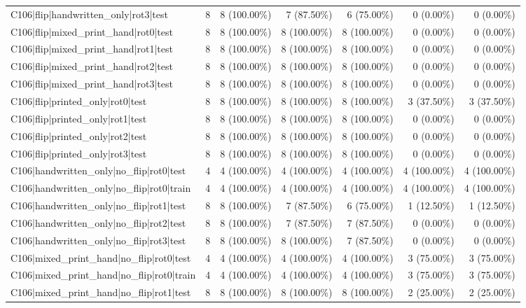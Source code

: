 \begin{longtable}{>{\raggedright\arraybackslash}p{5cm}rrrrrr}
C106|flip|handwritten\_only|rot3|test & 8 & 8 (100.00\%) & 7 (87.50\%) & 6 (75.00\%) & 0 (0.00\%) & 0 (0.00\%) \\
C106|flip|mixed\_print\_hand|rot0|test & 8 & 8 (100.00\%) & 8 (100.00\%) & 8 (100.00\%) & 0 (0.00\%) & 0 (0.00\%) \\
C106|flip|mixed\_print\_hand|rot1|test & 8 & 8 (100.00\%) & 8 (100.00\%) & 8 (100.00\%) & 0 (0.00\%) & 0 (0.00\%) \\
C106|flip|mixed\_print\_hand|rot2|test & 8 & 8 (100.00\%) & 8 (100.00\%) & 8 (100.00\%) & 0 (0.00\%) & 0 (0.00\%) \\
C106|flip|mixed\_print\_hand|rot3|test & 8 & 8 (100.00\%) & 8 (100.00\%) & 8 (100.00\%) & 0 (0.00\%) & 0 (0.00\%) \\
C106|flip|printed\_only|rot0|test & 8 & 8 (100.00\%) & 8 (100.00\%) & 8 (100.00\%) & 3 (37.50\%) & 3 (37.50\%) \\
C106|flip|printed\_only|rot1|test & 8 & 8 (100.00\%) & 8 (100.00\%) & 8 (100.00\%) & 0 (0.00\%) & 0 (0.00\%) \\
C106|flip|printed\_only|rot2|test & 8 & 8 (100.00\%) & 8 (100.00\%) & 8 (100.00\%) & 0 (0.00\%) & 0 (0.00\%) \\
C106|flip|printed\_only|rot3|test & 8 & 8 (100.00\%) & 8 (100.00\%) & 8 (100.00\%) & 0 (0.00\%) & 0 (0.00\%) \\
C106|handwritten\_only|no\_flip|rot0|test & 4 & 4 (100.00\%) & 4 (100.00\%) & 4 (100.00\%) & 4 (100.00\%) & 4 (100.00\%) \\
C106|handwritten\_only|no\_flip|rot0|train & 4 & 4 (100.00\%) & 4 (100.00\%) & 4 (100.00\%) & 4 (100.00\%) & 4 (100.00\%) \\
C106|handwritten\_only|no\_flip|rot1|test & 8 & 8 (100.00\%) & 7 (87.50\%) & 6 (75.00\%) & 1 (12.50\%) & 1 (12.50\%) \\
C106|handwritten\_only|no\_flip|rot2|test & 8 & 8 (100.00\%) & 7 (87.50\%) & 7 (87.50\%) & 0 (0.00\%) & 0 (0.00\%) \\
C106|handwritten\_only|no\_flip|rot3|test & 8 & 8 (100.00\%) & 8 (100.00\%) & 7 (87.50\%) & 0 (0.00\%) & 0 (0.00\%) \\
C106|mixed\_print\_hand|no\_flip|rot0|test & 4 & 4 (100.00\%) & 4 (100.00\%) & 4 (100.00\%) & 3 (75.00\%) & 3 (75.00\%) \\
C106|mixed\_print\_hand|no\_flip|rot0|train & 4 & 4 (100.00\%) & 4 (100.00\%) & 4 (100.00\%) & 3 (75.00\%) & 3 (75.00\%) \\
C106|mixed\_print\_hand|no\_flip|rot1|test & 8 & 8 (100.00\%) & 8 (100.00\%) & 8 (100.00\%) & 2 (25.00\%) & 2 (25.00\%) \\

\end{longtable}
